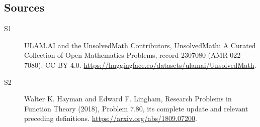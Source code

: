 \documentclass[11pt]{article}
\begin{document}
\subsection{Sources}
\begin{description}
\item[\hypertarget{source:2307080:1}{S1}] ULAM.AI and the UnsolvedMath Contributors, UnsolvedMath: A Curated Collection of Open Mathematics Problems, record 2307080 (AMR-022-7080). CC BY 4.0. \url{https://huggingface.co/datasets/ulamai/UnsolvedMath}.
\item[\hypertarget{source:2307080:2}{S2}] Walter K. Hayman and Edward F. Lingham, Research Problems in Function Theory (2018), Problem 7.80, its complete update and relevant preceding definitions. \url{https://arxiv.org/abs/1809.07200}.
\end{description}
\label{end:2307080}
\end{document}

